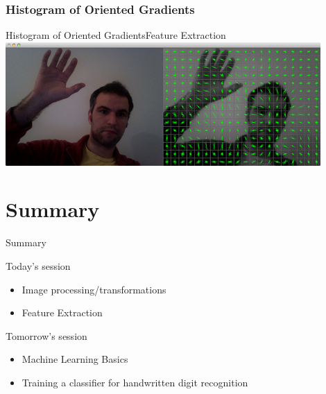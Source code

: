 \documentclass{beamer}
\begin{document}
\subsubsection{Histogram of Oriented Gradients}
\begin{frame}{Histogram of Oriented Gradients}{Feature Extraction}
\centering
    \includegraphics[width=120mm]{images/hog.jpg}

\end{frame}



\section*{Summary}
\begin{frame}{Summary}

\begin{block}{Today's session}
\begin{itemize}
\item Image processing/transformations
\item Feature Extraction
\end{itemize}
\end{block}

\begin{block}{Tomorrow's session}
\begin{itemize}
\item Machine Learning Basics
\item Training a classifier for handwritten digit recognition
\end{itemize}
\end{block}




\end{frame}
\end{document}
